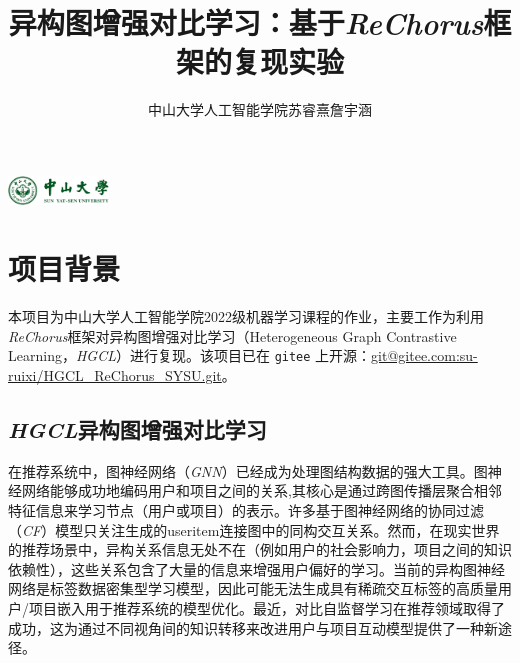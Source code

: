 \documentclass{article}
\title{异构图增强对比学习：基于\emph{ReChorus}框架的复现实验}
\author{中山大学人工智能学院\quad 苏睿熹\quad 詹宇涵}
\date{}
\begin{document}
\begin{minipage}[t]{\textwidth}
    \vspace{-0.5cm}
    \begin{center}
        \vspace{-1.5cm} %
        \includegraphics[width=0.2\textwidth]{sysu.jpg}\\
        \vspace{-1.5cm} %
    \end{center}
    \maketitle
\end{minipage}

\section{项目背景}

本项目为中山大学人工智能学院2022级机器学习课程的作业，主要工作为利用\emph{ReChorus}框架\cite{wang2020make}对异构图增强对比学习（Heterogeneous Graph Contrastive Learning，\emph{HGCL}）\cite{Chen_2023}进行复现。该项目已在 \lstinline{gitee} 上开源：\url{git@gitee.com:su-ruixi/HGCL_ReChorus_SYSU.git}。

\subsection{\emph{HGCL}异构图增强对比学习}

在推荐系统中，图神经网络（\emph{GNN}）已经成为处理图结构数据的强大工具。图神经网络能够成功地编码用户和项目之间的关系\cite{Wu_2022},其核心是通过跨图传播层聚合相邻特征信息来学习节点（用户或项目）的表示。许多基于图神经网络的协同过滤（\emph{CF}）模型只关注生成的useritem连接图中的同构交互关系\cite{Chen_2020,he2020lightgcnsimplifyingpoweringgraph,Wang_2019}。然而，在现实世界的推荐场景中，异构关系信息无处不在（例如用户的社会影响力，项目之间的知识依赖性），这些关系包含了大量的信息来增强用户偏好的学习。当前的异构图神经网络是标签数据密集型学习模型，因此可能无法生成具有稀疏交互标签的高质量用户/项目嵌入用于推荐系统的模型优化\cite{Long_2021,Wu_2021}。最近，对比自监督学习在推荐领域取得了成功，这为通过不同视角间的知识转移来改进用户与项目互动模型提供了一种新途径。
\end{document}

